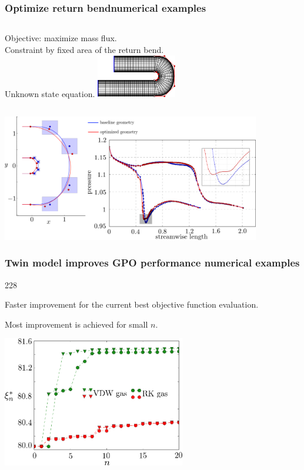 \documentclass{beamer}
\newcommand{\barrow}{\item[\color{darkred}\ding{228}]}
\begin{document}
\begin{frame}
    \frametitle{Optimize return bend\hfill \scriptsize{numerical examples}}\small
    \begin{columns}
        Objective: maximize mass flux.\\
        Constraint by fixed area of the return bend.\\
        Unknown state equation.
        \includegraphics[width=3.5cm]{spline_simple.png}
    \end{columns}
    \vspace{.3cm}
    \begin{center}
    \includegraphics[width=11.3cm]{Ubend_combined_new.png}
    \end{center}
\end{frame}

\begin{frame}
    \frametitle{Twin model improves GPO performance \hfill \scriptsize{numerical examples}}\small
    \begin{dinglist}{228}
        \barrow Faster improvement for the current best objective function evaluation.
        \barrow Most improvement is achieved for small $n$.
    \end{dinglist}
    \begin{center}
        \includegraphics[width=8cm]{obj_ubend_2.png}
    \end{center}
\end{frame}
\end{document}
